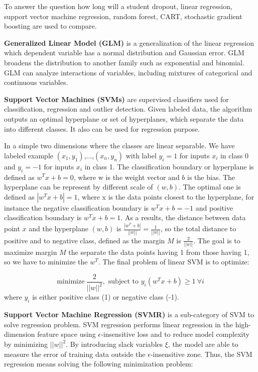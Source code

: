 \documentclass[12pt,english]{report}
\begin{document}
To answer the question how long will a student dropout, linear regression,
support vector
machine regression, random forest, CART, stochastic gradient boosting are used
to compare.

\textbf{Generalized Linear Model (GLM)} is a generalization of the linear
regression which 
dependent variable has a normal distribution and Gaussian error. GLM broadens
the distribution
to another family such as exponential and binomial. GLM can analyze
interactions of variables,
including mixtures of categorical and continuous variables.

\textbf{ Support Vector Machines (SVMs)} are supervised classifiers used for
classification,
regression and outlier detection. Given labeled data, the algorithm outputs an
optimal hyperplane
or set of hyperplanes, which separate the data into different classes. It also
can be used for
regression purpose.

In a simple two dimensions where the classes are linear separable. We have
labeled example 
$(x_1,y_1)$,...,$(x_n, y_n)$ with label $y_i = 1$ for inputs
$x_i$ in class 0 and $y_i = -1$ for inputs $x_i$ in class 1. The classification
boundary or
hyperplane is defined as $w^T x +b = 0$, where w is the weight vector and $b$
is the bias. 
The hyperplane can be represent by different scale of $(w,b)$. The optimal one
is defined 
as $|w^T x +b | = 1$, where x is the data points closest to the hyperplane, for
instance 
the negative classification boundary is $w^T x +b = -1$ and positive
classification boundary
is $w^T x +b  = 1$. As a results, the distance between data point $x$ and the
hyperplane 
$(w,b)$ is $ \frac{|w^T+b|}{||w||}= \frac{1}{||w||}$, so the total distance to
positive and
to negative class, defined as the margin $M$ is $\frac{2}{||w||}$.  The goal is
to maximize
margin $M$ the separate the data points having 1 from those having 1, so we
have to minimize
the $w^T$. The final problem of linear SVM is to optimize:

\begin{equation}
\text{minimize} \ \frac{2}{||w||^2},
\text{ subject to }
y_{i}(w^T x +b) \geq 1 \ \forall i
\end{equation}
where $y_i$ is either positive class (1) or negative class (-1).

\textbf{Support Vector Machine Regression (SVMR)} is a sub-category of SVM to
solve regression problem. 
SVM regression performs linear regression in the high-dimension feature space
using  $\epsilon$-insensitive loss and to reduce model complexity by
minimizing $||w||^2$. By introducing slack variables $\xi$, the model are able
to measure the error of training data outside the $\epsilon$-insensitive zone.
Thus, the SVM regression means solving the following minimization problem: 
\end{document}
